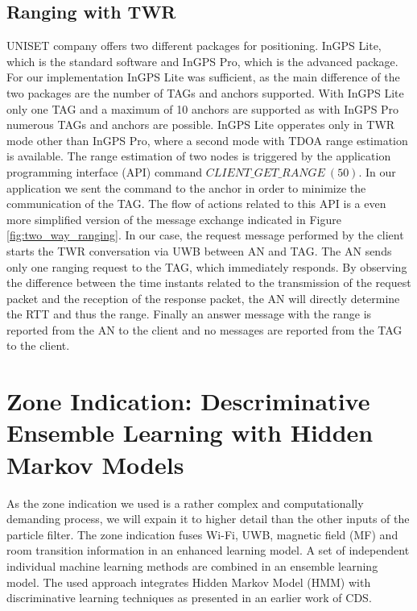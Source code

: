\subsection{Ranging with TWR}
UNISET company offers two different packages for positioning. InGPS Lite, which is the standard software and InGPS Pro, which is the advanced package. For our implementation InGPS Lite was sufficient, as the main difference of the two packages are the number of TAGs and anchors supported. With InGPS Lite only one TAG and a maximum of 10 anchors are supported as with InGPS Pro numerous TAGs and anchors are possible. InGPS Lite opperates only in TWR mode other than InGPS Pro, where a second mode with TDOA range estimation is available.
The range estimation of two nodes is triggered by the application programming interface (API) command $CLIENT\_GET\_RANGE\ (50)$. In our application we sent the command to the anchor in order to minimize the communication of the TAG. The flow of actions related to this API is a even more simplified version of the message exchange indicated in Figure \ref{fig:two_way_ranging}. In our case, the request message performed by the client starts the TWR conversation via UWB between AN and TAG. The AN sends only one ranging request to the TAG, which immediately responds. By observing the difference between the time instants related to the transmission of the request packet and the reception of the response packet, the AN will directly determine the RTT and thus the range. Finally an answer message with the range is reported from the AN to the client and no messages are reported from the TAG to the client.



\section{Zone Indication: Descriminative Ensemble Learning with Hidden Markov Models}
As the zone indication we used is a rather complex and computationally demanding process, we will expain it to higher detail than the other inputs of the particle filter. The zone indication fuses Wi-Fi, UWB, magnetic field (MF) and room transition information in an enhanced learning model. A set of independent individual machine learning methods are combined in an ensemble learning model. The used approach integrates Hidden Markov Model (HMM) with discriminative learning techniques as presented in an earlier work of CDS. \cite{Carrera2}

